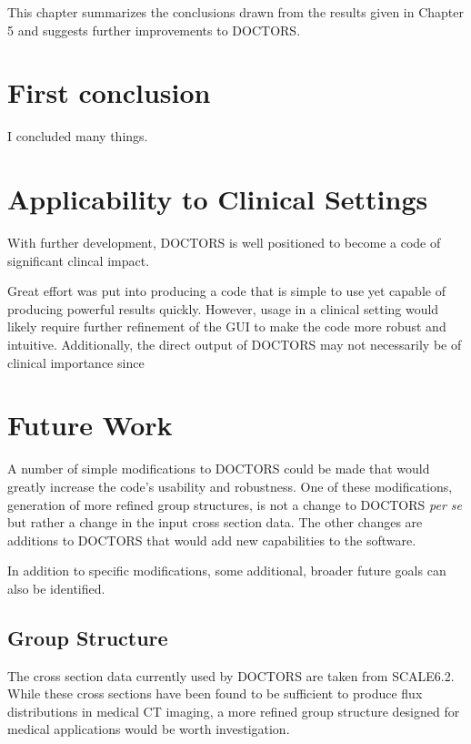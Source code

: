 
This chapter summarizes the conclusions drawn from the results given in Chapter 5 and suggests further improvements to DOCTORS.

\section{First conclusion}

I concluded many things.

\section{Applicability to Clinical Settings}
With further development, DOCTORS is well positioned to become a code of significant clincal impact.

Great effort was put into producing a code that is simple to use yet capable of producing powerful results quickly. However, usage in a clinical setting would likely require further refinement of the GUI to make the code more robust and intuitive. Additionally, the direct output of DOCTORS may not necessarily be of clinical importance since 

\section{Future Work}

A number of simple modifications to DOCTORS could be made that would greatly increase the code's usability and robustness. One of these modifications, generation of more refined group structures, is not a change to DOCTORS \textit{per se} but rather a change in the input cross section data. The other changes are additions to DOCTORS that would add new capabilities to the software.

In addition to specific modifications, some additional, broader future goals can also be identified.

\subsection{Group Structure}

The cross section data currently used by DOCTORS are taken from SCALE6.2. While these cross sections have been found to be sufficient to produce flux distributions in medical CT imaging, a more refined group structure designed for medical applications would be worth investigation.

